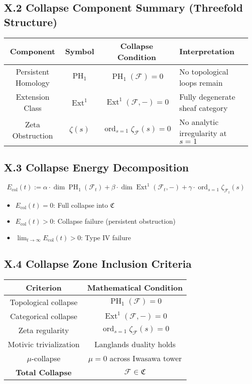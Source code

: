 \documentclass[11pt]{article}
\DeclareMathOperator{\Ext}{Ext}
\DeclareMathOperator{\PH}{PH}
\newcommand{\ord}{\operatorname{ord}}
\begin{document}
\subsection*{X.2 Collapse Component Summary (Threefold Structure)}

\begin{center}
\begin{tabular}{|c|c|c|l|}
\hline
\textbf{Component} & \textbf{Symbol} & \textbf{Collapse Condition} & \textbf{Interpretation} \\
\hline
Persistent Homology & \( \PH_1 \) & \( \PH_1(\mathcal{F}) = 0 \) & No topological loops remain \\
Extension Class     & \( \Ext^1 \) & \( \Ext^1(\mathcal{F}, -) = 0 \) & Fully degenerate sheaf category \\
Zeta Obstruction    & \( \zeta(s) \) & \( \ord_{s=1} \zeta_{\mathcal{F}}(s) = 0 \) & No analytic irregularity at \( s=1 \) \\
\hline
\end{tabular}
\end{center}

\subsection*{X.3 Collapse Energy Decomposition}

\[
E_{\mathrm{col}}(t) := \alpha \cdot \dim \PH_1(\mathcal{F}_t) + \beta \cdot \dim \Ext^1(\mathcal{F}_t, -) + \gamma \cdot \ord_{s = 1} \zeta_{\mathcal{F}_t}(s)
\]

\begin{itemize}
  \item \( E_{\mathrm{col}}(t) = 0 \): Full collapse into \( \mathfrak{C} \)
  \item \( E_{\mathrm{col}}(t) > 0 \): Collapse failure (persistent obstruction)
  \item \( \lim_{t \to \infty} E_{\mathrm{col}}(t) > 0 \): Type IV failure
\end{itemize}

\subsection*{X.4 Collapse Zone Inclusion Criteria}

\begin{center}
\begin{tabular}{|c|c|}
\hline
\textbf{Criterion} & \textbf{Mathematical Condition} \\
\hline
Topological collapse      & \( \PH_1(\mathcal{F}) = 0 \) \\
Categorical collapse      & \( \Ext^1(\mathcal{F}, -) = 0 \) \\
Zeta regularity           & \( \ord_{s=1} \zeta_{\mathcal{F}}(s) = 0 \) \\
Motivic trivialization    & Langlands duality holds \\
\( \mu \)-collapse                & \( \mu = 0 \) across Iwasawa tower \\
\hline
\textbf{Total Collapse}   & \( \mathcal{F} \in \mathfrak{C} \) \\
\hline
\end{tabular}
\end{center}
\end{document}
